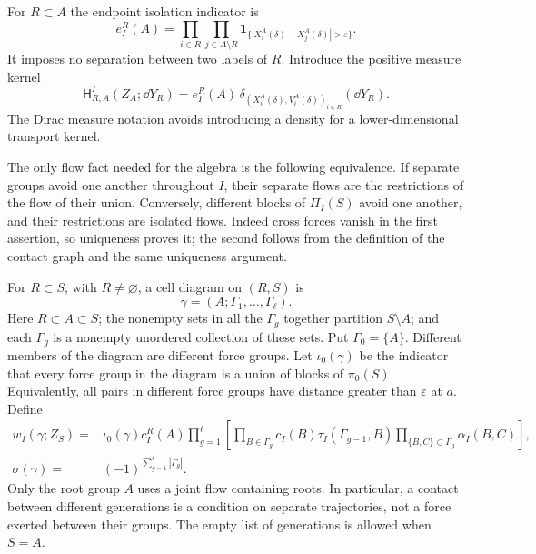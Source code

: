 For $R\subset A$ the endpoint isolation indicator is
\[
 e_I^R(A)=\prod_{i\in R}\prod_{j\in A\setminus R}
       \mathbf 1_{\{|X_i^A(\delta)-X_j^A(\delta)|>\varepsilon\}}.
\]
It imposes no separation between two labels of $R$.  Introduce the
positive measure kernel
\begin{equation}
 \mathsf H^I_{R,A}(Z_A;\dd Y_R)
   =e_I^R(A)\,
     \delta_{(X_i^A(\delta),V_i^A(\delta))_{i\in R}}(\dd Y_R).
 \label{eq:cell-H}
\end{equation}
The Dirac measure notation avoids introducing a density for a
lower-dimensional transport kernel.

The only flow fact needed for the algebra is the following equivalence.
If separate groups avoid one another throughout $I$, their separate
flows are the restrictions of the flow of their union.  Conversely,
different blocks of $\Pi_I(S)$ avoid one another, and their restrictions
are isolated flows.  Indeed cross forces vanish in the first assertion,
so uniqueness proves it; the second follows from the definition of the
contact graph and the same uniqueness argument.

\begin{definition}
\label{def:cell-diagram}
For $R\subset S$, with $R\ne\varnothing$, a cell diagram on $(R,S)$ is
\[
 \gamma=(A;\Gamma_1,\ldots,\Gamma_\ell).
\]
Here $R\subset A\subset S$; the nonempty sets in all the $\Gamma_g$
together partition $S\setminus A$; and each $\Gamma_g$ is a nonempty
unordered collection of these sets.  Put $\Gamma_0=\{A\}$.
Different members of the diagram are different force groups.  Let
$\iota_0(\gamma)$ be the indicator that every force group in the diagram
is a union of blocks of $\pi_0(S)$.  Equivalently, all pairs in different
force groups have distance greater than $\varepsilon$ at $a$.
Define
\begin{align}
 w_I(\gamma;Z_S)
  ={}&\iota_0(\gamma)c_I^R(A)
       \prod_{g=1}^{\ell}
       \left[
        \prod_{B\in\Gamma_g}c_I(B)\tau_I(\Gamma_{g-1},B)
        \prod_{\{B,C\}\subset\Gamma_g}\alpha_I(B,C)
       \right],                                      \label{eq:cell-weight}\\
 \sigma(\gamma)={}&(-1)^{\sum_{g=1}^{\ell}|\Gamma_g|}.
                                                        \label{eq:cell-sign}
\end{align}
Only the root group $A$ uses a joint flow containing roots.  In
particular, a contact between different generations is a condition on
separate trajectories, not a force exerted between their groups.
The empty list of generations is allowed when $S=A$.
\end{definition}


